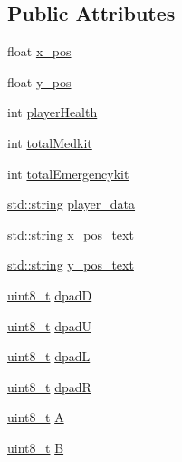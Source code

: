 \subsection*{Public Attributes}
\begin{DoxyCompactItemize}
\item 
float \hyperlink{structPlayer__Data_afb5e8c680382597bced321c1d96947b7}{x\+\_\+pos}
\item 
float \hyperlink{structPlayer__Data_a884e62bee1bfe66d7ea3998282190543}{y\+\_\+pos}
\item 
int \hyperlink{structPlayer__Data_ad12d2eb039cc72f143cb1ffb5fcf150f}{player\+Health}
\item 
int \hyperlink{structPlayer__Data_a45ccb74dd421e3b04ff76c867ae3998d}{total\+Medkit}
\item 
int \hyperlink{structPlayer__Data_a3c983a86d45b6ce01961c35f2ee1600a}{total\+Emergencykit}
\item 
\hyperlink{imgui__impl__opengl3__loader_8h_ac83513893df92266f79a515488701770}{std\+::string} \hyperlink{structPlayer__Data_ab0fc6bc29a95489e817593a14f919d33}{player\+\_\+data}
\item 
\hyperlink{imgui__impl__opengl3__loader_8h_ac83513893df92266f79a515488701770}{std\+::string} \hyperlink{structPlayer__Data_ad8adb6d31cdad282cd24467e057ed52c}{x\+\_\+pos\+\_\+text}
\item 
\hyperlink{imgui__impl__opengl3__loader_8h_ac83513893df92266f79a515488701770}{std\+::string} \hyperlink{structPlayer__Data_a2365eeec519f45b9c3d3b88ec905949c}{y\+\_\+pos\+\_\+text}
\item 
\hyperlink{stdint_8h_aba7bc1797add20fe3efdf37ced1182c5}{uint8\+\_\+t} \hyperlink{structPlayer__Data_a4eb98519357552bf1406d3e074998b9c}{dpadD}
\item 
\hyperlink{stdint_8h_aba7bc1797add20fe3efdf37ced1182c5}{uint8\+\_\+t} \hyperlink{structPlayer__Data_a27800364e36919d741cfe0c435bd6436}{dpadU}
\item 
\hyperlink{stdint_8h_aba7bc1797add20fe3efdf37ced1182c5}{uint8\+\_\+t} \hyperlink{structPlayer__Data_a28f51cac6134863144c940e9873a0ec5}{dpadL}
\item 
\hyperlink{stdint_8h_aba7bc1797add20fe3efdf37ced1182c5}{uint8\+\_\+t} \hyperlink{structPlayer__Data_a8ff5739b98185038578b540d76968b00}{dpadR}
\item 
\hyperlink{stdint_8h_aba7bc1797add20fe3efdf37ced1182c5}{uint8\+\_\+t} \hyperlink{structPlayer__Data_a7a048f31e296b223a1d85bc2b17acabd}{A}
\item 
\hyperlink{stdint_8h_aba7bc1797add20fe3efdf37ced1182c5}{uint8\+\_\+t} \hyperlink{structPlayer__Data_acb052361bd1552c1c9f453662d5789e8}{B}

\end{DoxyCompactItemize}

